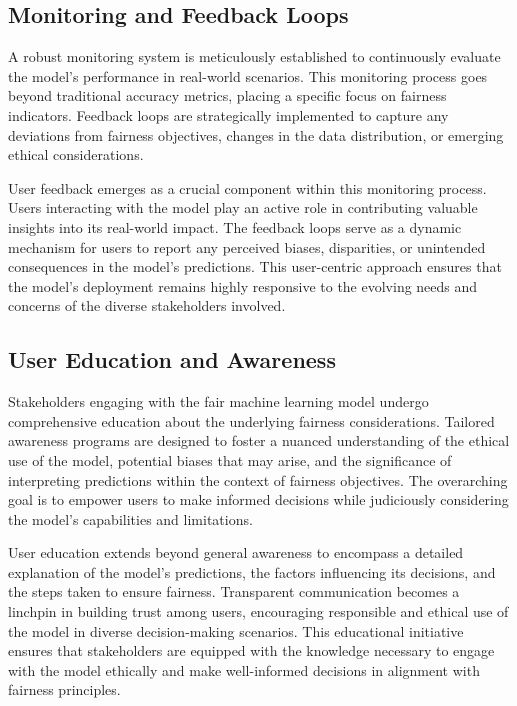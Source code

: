 \documentclass[12pt,a4paper,openright,twoside]{book}
\begin{document}
\subsection{Monitoring and Feedback Loops}

A robust monitoring system is meticulously established to continuously evaluate the model's performance in real-world scenarios. This monitoring process goes beyond traditional accuracy metrics, placing a specific focus on fairness indicators. Feedback loops are strategically implemented to capture any deviations from fairness objectives, changes in the data distribution, or emerging ethical considerations.

User feedback emerges as a crucial component within this monitoring process. Users interacting with the model play an active role in contributing valuable insights into its real-world impact. The feedback loops serve as a dynamic mechanism for users to report any perceived biases, disparities, or unintended consequences in the model's predictions. This user-centric approach ensures that the model's deployment remains highly responsive to the evolving needs and concerns of the diverse stakeholders involved.

\subsection{User Education and Awareness}

Stakeholders engaging with the fair machine learning model undergo comprehensive education about the underlying fairness considerations. Tailored awareness programs are designed to foster a nuanced understanding of the ethical use of the model, potential biases that may arise, and the significance of interpreting predictions within the context of fairness objectives. The overarching goal is to empower users to make informed decisions while judiciously considering the model's capabilities and limitations.

User education extends beyond general awareness to encompass a detailed explanation of the model's predictions, the factors influencing its decisions, and the steps taken to ensure fairness. Transparent communication becomes a linchpin in building trust among users, encouraging responsible and ethical use of the model in diverse decision-making scenarios. This educational initiative ensures that stakeholders are equipped with the knowledge necessary to engage with the model ethically and make well-informed decisions in alignment with fairness principles.
\end{document}
